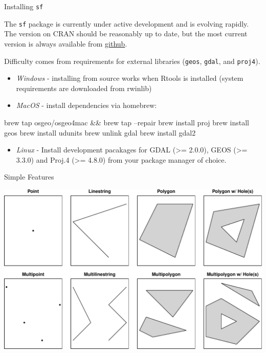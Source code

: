\documentclass[11pt,ignorenonframetext,]{beamer}
\providecommand{\tightlist}{%
  \setlength{\itemsep}{0pt}\setlength{\parskip}{0pt}}
\let\oldShaded\Shaded
\let\endoldShaded\endShaded
\let\oldverbatim\verbatim
\let\endoldverbatim\endverbatim
\renewenvironment{verbatim}{\footnotesize\begin{spacing}{0.9}\oldverbatim}{\endoldverbatim\end{spacing}}
\newcommand{\scriptoutput}{
  \renewenvironment{Shaded}{\scriptsize\begin{spacing}{0.9}\oldShaded}{\endoldShaded\end{spacing}}
  \renewenvironment{verbatim}{\scriptsize\begin{spacing}{0.9}\oldverbatim}{\endoldverbatim\end{spacing}}
}
\begin{document}
\begin{frame}[fragile]{Installing \texttt{sf}}

\footnotesize

The \texttt{sf} package is currently under active development and is
evolving rapidly. The version on CRAN should be reasonably up to date,
but the most current version is always available from
\href{https://github.com/edzer/sfr/}{github}.

Difficulty comes from requirements for external libraries
(\texttt{geos}, \texttt{gdal}, and \texttt{proj4}).

\begin{itemize}
\item
  \emph{Windows} - installing from source works when Rtools is installed
  (system requirements are downloaded from rwinlib)
\item
  \emph{MacOS} - install dependencies via homebrew:
\end{itemize}

\scriptoutput

\begin{verbatim}
brew tap osgeo/osgeo4mac && brew tap --repair
brew install proj 
brew install geos 
brew install udunits
brew unlink gdal
brew install gdal2 
\end{verbatim}

\begin{itemize}
\tightlist
\item
  \emph{Linux} - Install development pacakages for GDAL (\textgreater{}=
  2.0.0), GEOS (\textgreater{}= 3.3.0) and Proj.4 (\textgreater{}=
  4.8.0) from your package manager of choice.
\end{itemize}

\end{frame}

\begin{frame}{Simple Features}

\includegraphics{Lec16_files/figure-beamer/unnamed-chunk-1-1.pdf}

\end{frame}
\end{document}
